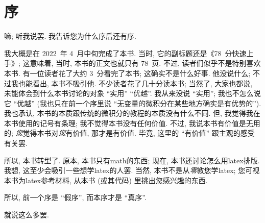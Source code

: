 \chapter{序}

嘛; 听我说罢.
我告诉您为什么序后还有序.

我大概是在 2022~年 4~月中旬完成了本书.
当时, 它的副标题还是《78~分快速上手》;
这意味着, 当时, 本书的正文也就只有 78~页.
不过, 读者们似乎不是特别喜欢本书.
有一位读者花了大约 3~分看完了本书;
这确实不是什么好事.
他没说什么; 不过我也能看出, 本书不吸引他.
不少读者花了几十分读本书;
当然了, 大家也都说,
未能体会到什么本书讨论的对象 ``实用'' ``优越''.
我从来没说 ``实用'';
我也不怎么说它 ``优越''
(我也只在前一个序里说
``无变量的微积分在某些地方确实是有优势的'').
我也承认,
本书的本质跟传统的微积分的教程的本质没有什么不同.
但, 我觉得我在本书使用的记号有条理;
我不觉得本书没有任何价值.
不过, 我说本书有价值是无用的;
\emph{您}觉得本书对\emph{您}有价值, 那才是有价值.
毕竟, 这里的 ``有价值'' 跟主观的感受有关罢.

所以, 本书转型了.
原本, 本书只有\gls{math}的东西;
现在, 本书还讨论怎么用\gls{latex}排版.
我想, 这至少会吸引一些想学\gls{latex}的人罢.
当然, 本书不是从\emph{零}教您学\gls{latex};
您可视本书为\gls{latex}参考材料,
从本书 (或其代码) 里挑出您感兴趣的东西.

所以, 前一个序是 ``假序'', 而本序才是 ``真序''.

就说这么多罢.

\begin{flushright}
    \theauthor\\
    \thedate
\end{flushright}
